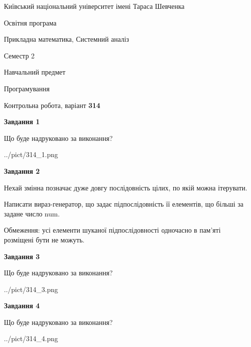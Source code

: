 \documentclass[12pt, ukrainian]{article}
\begin{document}
{{\begin {small}\par
{ \center  Київський національний університет імені Тараса Шевченка \par}
{\parbox {5 cm}{Освітня програма \hfill}{\parbox {8 cm}{Прикладна математика, Системний аналіз \hfill}}\parbox {5 cm}{\hfill Семестр 2}}\par
{\parbox {5 cm} {Навчальний предмет \hfill}\parbox {7 cm}{Програмування \hfill}\parbox {6cm}{\hfill}\par}\vspace{-7pt} \end{small}}{\center Контрольна робота, варіант  \No \textbf
{ 314 }\par}}
{
\begin {large}
{\begin {center}\textbf{Завдання 1}\end {center}}\par
Що буде надруковано за виконання?\par\par
\begin{center}
	{../pict/314_1.png}
\end{center}
\newpage

{\begin {center}\textbf{Завдання 2}\end {center}}\par
Нехай змінна  позначає дуже довгу послідовність цілих, по якій можна ітерувати.

Написати вираз-генератор, що задає підпослідовність її елементів, що більші за задане число num.

Обмеження: усі елементи шуканої підпослідовності одночасно в пам'яті розміщені бути не можуть.\par
\newpage

{\begin {center}\textbf{Завдання 3}\end {center}}\par
Що буде надруковано за виконання?\par
\begin{center}
	{../pict/314_3.png}
\end{center}
\newpage

{\begin {center}\textbf{Завдання 4}\end {center}}\par
Що буде надруковано за виконання?\par
\begin{center}
	{../pict/314_4.png}
\end{center}
\newpage


\end{large}}
\end{document}
